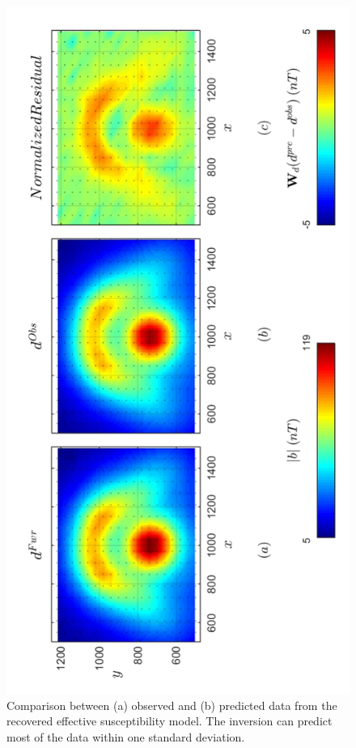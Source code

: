 \begin{figure}[h!]
\centering
\includegraphics[scale=0.52, angle =270]{3D_Inv_l2l2_pred_kEff.pdf}
\caption{Comparison between (a) observed and (b) predicted data from the recovered effective susceptibility model. The inversion can predict most of the data within one standard deviation.}
\label{fig:3D_Inv_l2l2_pred_kEff}
\end{figure}



